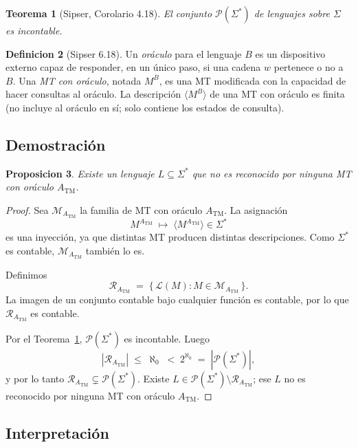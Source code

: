 \documentclass[11pt,a4paper]{article}
\theoremstyle{plain}
\newtheorem{teorema}{Teorema}[section]
\newtheorem{proposicion}[teorema]{Proposicion}
\theoremstyle{definition}
\newtheorem{definicion}[teorema]{Definicion}
\theoremstyle{remark}
\newcommand{\TM}{\mathrm{TM}}
\newcommand{\enc}[1]{\langle #1\rangle}
\newcommand{\lang}{\mathcal{L}}
\newcommand{\Sstar}{\Sigma^{*}}
\newcommand{\ATM}{A_{\TM}}
\newcommand{\Powerset}{\mathcal{P}}
\begin{document}
\begin{teorema}[Sipser, Corolario 4.18]
\label{teo:incont}
El conjunto $\Powerset(\Sstar)$ de lenguajes sobre $\Sigma$ es incontable.
\end{teorema}

\begin{definicion}[Sipser 6.18]
Un \emph{or\'aculo} para el lenguaje $B$ es un dispositivo externo capaz de
responder, en un \'unico paso, si una cadena $w$ pertenece o no a $B$. Una
\emph{MT con or\'aculo}, notada $M^{B}$, es una MT modificada con la
capacidad de hacer consultas al or\'aculo. La descripci\'on $\enc{M^{B}}$
de una MT con or\'aculo es finita (no incluye al or\'aculo en s\'i; solo
contiene los estados de consulta).
\end{definicion}

\subsection*{Demostraci\'on}

\begin{proposicion}
\label{prop:ej4}
Existe un lenguaje $L\subseteq\Sstar$ que no es reconocido por ninguna MT con
or\'aculo $\ATM$.
\end{proposicion}

\begin{proof}
Sea $\mathcal{M}_{\ATM}$ la familia de MT con or\'aculo $\ATM$. La
asignaci\'on
\[
  M^{\ATM} \;\longmapsto\; \enc{M^{\ATM}}\in\Sstar
\]
es una inyecci\'on, ya que distintas MT producen distintas descripciones.
Como $\Sstar$ es contable, $\mathcal{M}_{\ATM}$ tambi\'en lo es.

Definimos
\[
  \mathcal{R}_{\ATM} \;=\; \{\,\lang(M) : M\in\mathcal{M}_{\ATM}\,\}.
\]
La imagen de un conjunto contable bajo cualquier funci\'on es contable, por
lo que $\mathcal{R}_{\ATM}$ es contable.

Por el Teorema~\ref{teo:incont}, $\Powerset(\Sstar)$ es incontable. Luego
\[
  |\mathcal{R}_{\ATM}| \;\le\; \aleph_0 \;<\; 2^{\aleph_0} \;=\;
  |\Powerset(\Sstar)|,
\]
y por lo tanto $\mathcal{R}_{\ATM}\subsetneq \Powerset(\Sstar)$. Existe
$L\in\Powerset(\Sstar)\setminus\mathcal{R}_{\ATM}$; ese $L$ no es reconocido
por ninguna MT con or\'aculo $\ATM$.
\end{proof}

\subsection*{Interpretaci\'on}
\end{document}
